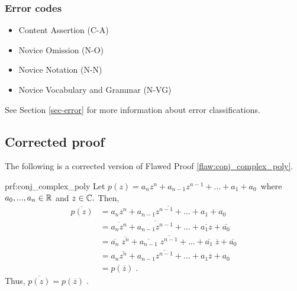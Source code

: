 \subsubsection{Error codes}
\begin{itemize}
	\item 	Content Assertion (C-A)
\item Novice Omission (N-O)
	\item   Novice Notation (N-N)
\item Novice Vocabulary and Grammar (N-VG)
\end{itemize}
See Section \ref{sec-error} for more information about error classifications.

\clearpage
\subsection{Corrected proof}

The following is a corrected version of Flawed Proof \ref{flaw:conj_complex_poly}. %

\begin{prf}{prf:conj_complex_poly} %
Let $p(z) = a_nz^n + a_{n-1}z^{n-1} + ... + a_1 + a_0\,$ where $a_0,...,a_n \in \mathbb R$ and $z \in \mathbb C.$  Then,
\begin{align*}
    \overline{p(z)} &= \overline{a_nz^n + a_{n-1}z^{n-1} + ... + a_1 + a_0} \\
    &= \overline{a_nz^n} + \overline{a_{n-1}z^{n-1}} + ... + \overline{a_1z} + \overline{a_0} \\
    &= \overline{a_n}\;\overline{z^n} + \overline{a_{n-1}}\;\overline{z^{n-1}} + ... + \overline{a_1}\;\overline{z} + \overline{a_0} \\
    &= a_n\overline{z^n} + a_{n-1}\overline{z^{n-1}} + ... + a_1\overline{z} + a_0 \\
    &=p(\overline{z})\;.
\end{align*}
Thus, $\overline{p(z)} = p(\overline{z})\;.$
\end{prf} 